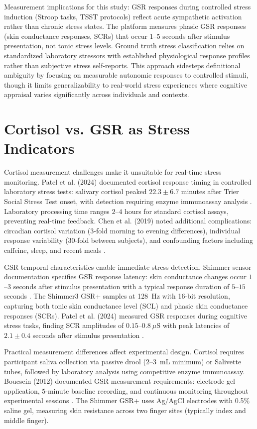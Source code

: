 \documentclass{report}
\begin{document}
    Measurement implications for this study: GSR responses during controlled stress induction (Stroop tasks, TSST protocols) reflect acute sympathetic activation rather than chronic stress states. The platform measures phasic GSR responses (skin conductance responses, SCRs) that occur $1$--$5$ seconds after stimulus presentation, not tonic stress levels. Ground truth stress classification relies on standardized laboratory stressors with established physiological response profiles rather than subjective stress self-reports. This approach sidesteps definitional ambiguity by focusing on measurable autonomic responses to controlled stimuli, though it limits generalizability to real-world stress experiences where cognitive appraisal varies significantly across individuals and contexts.

    \section{Cortisol vs. GSR as Stress Indicators}
    \label{sec:cortisol_vs_gsr}

    Cortisol measurement challenges make it unsuitable for real-time stress monitoring. Patel et al. (2024) documented cortisol response timing in controlled laboratory stress tests: salivary cortisol peaked $22.3 \pm 6.7$ minutes after Trier Social Stress Test onset, with detection requiring enzyme immunoassay analysis \cite{patel2024}. Laboratory processing time ranges $2$--$4$ hours for standard cortisol assays, preventing real-time feedback. Chen et al. (2019) noted additional complications: circadian cortisol variation ($3$-fold morning to evening differences), individual response variability ($30$-fold between subjects), and confounding factors including caffeine, sleep, and recent meals \cite{chen2019}.

    GSR temporal characteristics enable immediate stress detection. Shimmer sensor documentation specifies GSR response latency: skin conductance changes occur $1$--$3$ seconds after stimulus presentation with a typical response duration of $5$--$15$ seconds \cite{shimmerdoc8}. The Shimmer3 GSR+ samples at 128~Hz with 16-bit resolution, capturing both tonic skin conductance level (SCL) and phasic skin conductance responses (SCRs). Patel et al. (2024) measured GSR responses during cognitive stress tasks, finding SCR amplitudes of $0.15$--$0.8~\mu$S with peak latencies of $2.1 \pm 0.4$ seconds after stimulus presentation \cite{patel2024}.

    Practical measurement differences affect experimental design. Cortisol requires participant saliva collection via passive drool ($2$--$3$~mL minimum) or Salivette tubes, followed by laboratory analysis using competitive enzyme immunoassay. Boucsein (2012) documented GSR measurement requirements: electrode gel application, $5$-minute baseline recording, and continuous monitoring throughout experimental sessions \cite{boucsein2012}. The Shimmer GSR+ uses Ag/AgCl electrodes with 0.5\% saline gel, measuring skin resistance across two finger sites (typically index and middle finger).
\end{document}
